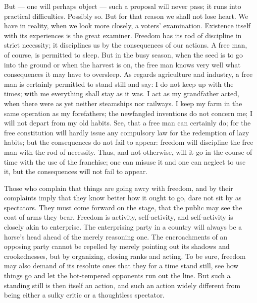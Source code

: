 \documentclass[12pt,a4paper,openany]{book}
\newcommand{\opage}[1]{\marginnote{\footnotesize\textit{[#1]}}}
\begin{document}
But --- one will perhaps object --- such a proposal
will never pass; it runs into practical
\setcounter{footnote}{0}%
\opage{67}difficulties. Possibly so. But for that reason we shall
not lose heart. We have in reality, when
we look more closely, a voters' examination. Existence itself
with its experiences is the great examiner. Freedom
has its rod of discipline in strict necessity; it
disciplines us by the consequences of our actions. A free
man, of course, is permitted to sleep. But in the
busy season, when the seed is to go into the ground or when the harvest
is on, the free man knows very well what consequences
it may have to oversleep. As regards agriculture and
industry, a free man is certainly permitted
to stand still and say: I do not keep up with the times; with
me everything shall stay as it was. I act as
my grandfather acted, when there were as yet neither
steamships nor railways. I keep my farm in the
same operation as my forefathers; the newfangled inventions
do not concern me; I will not depart from my
old habits. See, that a free man can certainly
do; for the free constitution will hardly issue any compulsory law for the redemption of lazy habits; but the consequences
do not fail to appear: freedom will discipline the free man
with the rod of necessity. Thus, and not otherwise,
will it go in the course of time with the use of the franchise;
one can misuse it and one can neglect
to use it, but the consequences will not fail to appear.

Those who complain that things are going awry with freedom,
and by their complaints imply that they know better
how it ought to go, dare not sit by as spectators.
They must come forward on the stage, that the public
may see the coat of arms they bear. Freedom is activity,
self-activity, and self-activity is closely
akin to enterprise. The enterprising party in a country
\setcounter{footnote}{0}%
\opage{68}will always be a horse's head ahead of the merely reasoning one.
The encroachments of an opposing party cannot be repelled
by merely pointing out its shadows and crookednesses, but
by organizing, closing ranks and acting.
To be sure, freedom may also demand of its resolute ones
that they for a time stand still, see how things go and let
the hot-tempered opponents run out the line. But such
a standing still is then itself an action, and such an
action widely different from being either a sulky
critic or a thoughtless spectator.
\end{document}
